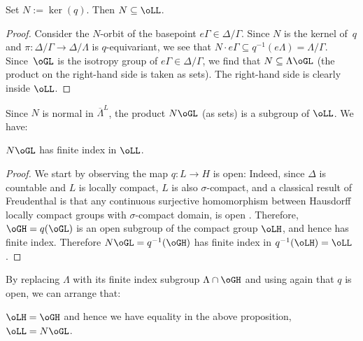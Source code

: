 \begin{prop}\label{prop:NinGamma}
Set $N:=\ker(q)$. Then $N\subseteq \oLL$.
\end{prop}
\begin{proof} Consider the $N$-orbit of the basepoint $e\Gamma\in \Delta / \Gamma$. Since $N$ is the kernel of~$q$ and $\pi:\Delta/\Gamma\to\Delta/\Lambda$ is $q$-equivariant, we see that $N\cdot e\Gamma\subseteq q^{-1}(e\Lambda)=\Lambda / \Gamma$. Since~$\oGL$ is the isotropy group of $e\Gamma\in \Delta / \Gamma$, we find that $N\subseteq \Lambda \oGL$ (the product on the right-hand side is taken as sets). The right-hand side is clearly inside $\oLL$. \end{proof}
Since $N$ is normal in $\overline{\Lambda}^L$, the product $N\oGL$ (as sets) is a subgroup of $\oLL$. We have:
\begin{prop}\label{prop:propbyN}
$N\oGL$ has finite index in $\oLL$.
\end{prop}
\begin{proof} We start by observing the map $q:L\to H$ is open: Indeed, since $\Delta$ is countable and $L$ is locally compact, $L$ is also $\sigma$-compact, and a classical result of Freudenthal is that any continuous surjective homomorphism between Hausdorff locally compact groups with $\sigma$-compact domain, is open \cite[Cor.\,2.D.6]{cornulier-dlh-book}. Therefore, $\oGH=q(\oGL)$ is an open subgroup of the compact group $\oLH$, and hence has finite index. Therefore $N\oGL=q^{-1}(\oGH)$ has finite index in $q^{-1}(\oLH)=\oLL$.\end{proof}

By replacing $\Lambda$ with its finite index subgroup $\Lambda\cap\oGH$ and using again that $q$ is open, we can arrange that:

\begin{assume}\label{assume:oLH=oGH}
$\oLH=\oGH$ and hence we have equality in the above proposition, \ie $\oLL=N\oGL$.
\end{assume}

